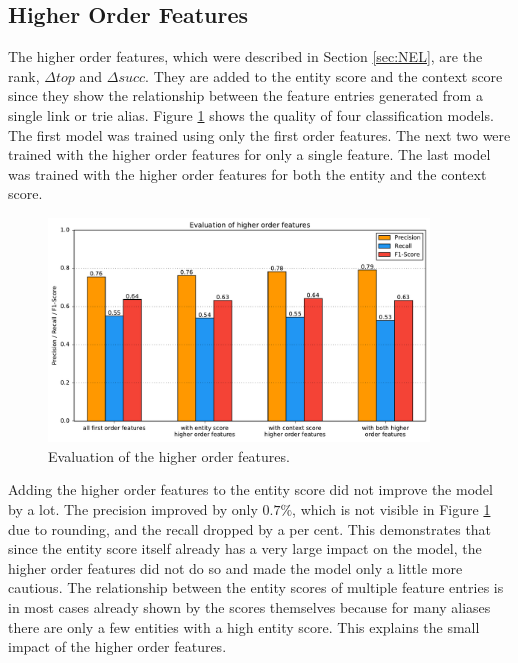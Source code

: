 \subsection{Higher Order Features}
The higher order features, which were described in Section \ref{sec:NEL}, are the rank, $\Delta top$ and $\Delta succ$. They are added to the entity score and the context score since they show the relationship between the feature entries generated from a single link or trie alias. Figure \ref{ho_eval_gen} shows the quality of four classification models. The first model was trained using only the first order features. The next two were trained with the higher order features for only a single feature. The last model was trained with the higher order features for both the entity and the context score.\par
\begin{figure}[H]
	\centering
	\includegraphics[width=0.9\textwidth]{img/higher_order_eval}
	\caption{Evaluation of the higher order features.}
	\label{ho_eval_gen}
\end{figure}
Adding the higher order features to the entity score did not improve the model by a lot. The precision improved by only $0.7\%$, which is not visible in Figure \ref{ho_eval_gen} due to rounding, and the recall dropped by a per cent. This demonstrates that since the entity score itself already has a very large impact on the model, the higher order features did not do so and made the model only a little more cautious. The relationship between the entity scores of multiple feature entries is in most cases already shown by the scores themselves because for many aliases there are only a few entities with a high entity score. This explains the small impact of the higher order features.\par
